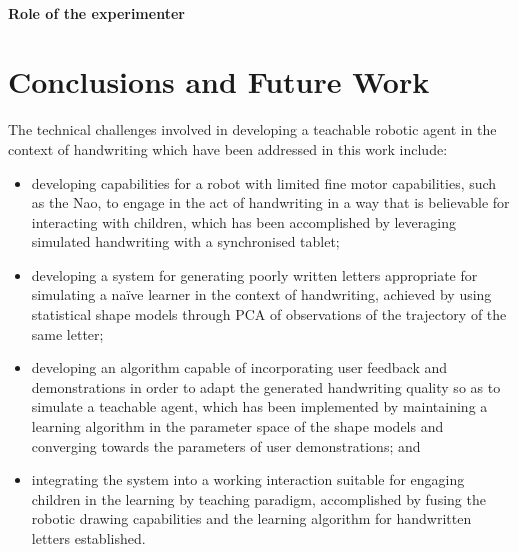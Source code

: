 \documentclass{sig-alternate}
\begin{document}

\paragraph{Role of the experimenter}

\section{Conclusions and Future Work}


The technical challenges involved in developing a teachable robotic agent in the
context of handwriting which have been addressed in this work include:

\begin{itemize}

    \item developing capabilities for a robot with limited fine motor
        capabilities, such as the Nao, to engage in the act of handwriting in a
        way that is believable for interacting with children, which has been
        accomplished by leveraging simulated handwriting with a synchronised
        tablet;

    \item developing a system for generating poorly written letters appropriate
        for simulating a na\"ive learner in the context of handwriting, achieved
        by using statistical shape models through PCA of observations of the
        trajectory of the same letter;

    \item developing an algorithm capable of incorporating user feedback and
        demonstrations in order to adapt the generated handwriting quality so as
        to simulate a teachable agent, which has been implemented by maintaining
        a learning algorithm in the parameter space of the shape models and
        converging towards the parameters of user demonstrations; and

    \item integrating the system into a working interaction suitable for
        engaging children in the learning by teaching paradigm, accomplished by
        fusing the robotic drawing capabilities and the learning algorithm for
        handwritten letters established.

\end{itemize}
\end{document}
